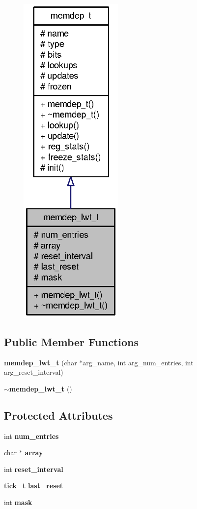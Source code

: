 \begin{figure}[H]
\begin{center}
\leavevmode
\includegraphics[width=144pt]{classmemdep__lwt__t__coll__graph}
\end{center}
\end{figure}
\subsection*{Public Member Functions}
\begin{CompactItemize}
\item 
{\bf memdep\_\-lwt\_\-t} (char $\ast$arg\_\-name, int arg\_\-num\_\-entries, int arg\_\-reset\_\-interval)
\item 
{\bf $\sim$memdep\_\-lwt\_\-t} ()
\end{CompactItemize}
\subsection*{Protected Attributes}
\begin{CompactItemize}
\item 
int {\bf num\_\-entries}
\item 
char $\ast$ {\bf array}
\item 
int {\bf reset\_\-interval}
\item 
{\bf tick\_\-t} {\bf last\_\-reset}
\item 
int {\bf mask}
\end{CompactItemize}


